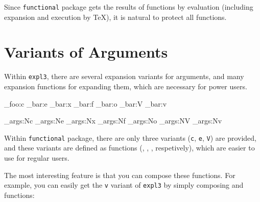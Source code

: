 \documentclass[oneside]{book}
\begin{document}
Since \verb!functional! package gets the results of functions by evaluation
(including expansion and execution by \TeX), it is natural to protect all functions.

\section{Variants of Arguments}

Within \verb!expl3!, there are several expansion variants for arguments,
and many expansion functions for expanding them, which are necessary for power users.

\begin{minipage}{0.5\textwidth}
\begin{code}[language=latex/latex3]
\module_foo:c
\module_bar:e
\module_bar:x
\module_bar:f
\module_bar:o
\module_bar:V
\module_bar:v
\end{code}
\end{minipage}%
\begin{minipage}{0.5\textwidth}
\begin{code}[language=latex/latex3]
\exp_args:Nc
\exp_args:Ne
\exp_args:Nx
\exp_args:Nf
\exp_args:No
\exp_args:NV
\exp_args:Nv
\end{code}
\end{minipage}

Within \verb!functional! package, there are only three variants
(\verb!c!, \verb!e!, \verb!V!) are provided, and these variants are defined
as functions (, , , respetively),
which are easier to use for regular users.

\begin{demohigh}
\newcommand\test{uvw}
\end{demohigh}

\begin{demohigh}
\newcommand\test{uvw}
\expWhole{111\test222}
\end{demohigh}

\begin{demohigh}
\intSet{}
\expValue\lTmpaInt
\end{demohigh}

The most interesting feature is that you can compose these functions.
For example, you can easily get the \verb!v! variant of \verb!expl3! by
simply composing  and  functions:

\begin{demohigh}
\intSet{}
\end{demohigh}
\end{document}
